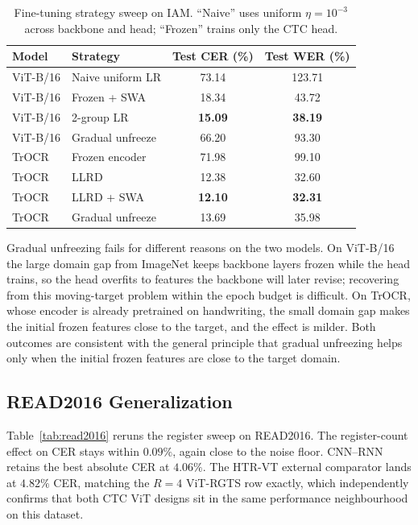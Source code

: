 \begin{table}[h]
\centering
\small
\caption{Fine-tuning strategy sweep on IAM. ``Naive'' uses uniform $\eta = 10^{-3}$ across backbone and head; ``Frozen'' trains only the CTC head.}
\label{tab:finetune}
\begin{tabular}{llcc}
\toprule
Model & Strategy & Test CER (\%) & Test WER (\%) \\
\midrule
ViT-B/16 & Naive uniform LR       & 73.14 & 123.71 \\
ViT-B/16 & Frozen + SWA           & 18.34 & 43.72  \\
ViT-B/16 & 2-group LR             & \textbf{15.09} & \textbf{38.19} \\
ViT-B/16 & Gradual unfreeze       & 66.20 & 93.30  \\
TrOCR    & Frozen encoder         & 71.98 & 99.10  \\
TrOCR    & LLRD                   & 12.38 & 32.60  \\
TrOCR    & LLRD + SWA             & \textbf{12.10} & \textbf{32.31} \\
TrOCR    & Gradual unfreeze       & 13.69 & 35.98  \\
\bottomrule
\end{tabular}
\end{table}

Gradual unfreezing fails for different reasons on the two models. On ViT-B/16 the large domain gap from ImageNet keeps backbone layers frozen while the head trains, so the head overfits to features the backbone will later revise; recovering from this moving-target problem within the epoch budget is difficult. On TrOCR, whose encoder is already pretrained on handwriting, the small domain gap makes the initial frozen features close to the target, and the effect is milder. Both outcomes are consistent with the general principle that gradual unfreezing helps only when the initial frozen features are close to the target domain.

\subsection{READ2016 Generalization}
\label{sec:res_read2016}

Table~\ref{tab:read2016} reruns the register sweep on READ2016. The register-count effect on CER stays within $0.09\%$, again close to the noise floor. CNN--RNN retains the best absolute CER at $4.06\%$. The HTR-VT external comparator lands at $4.82\%$ CER, matching the $R = 4$ ViT-RGTS row exactly, which independently confirms that both CTC ViT designs sit in the same performance neighbourhood on this dataset.

